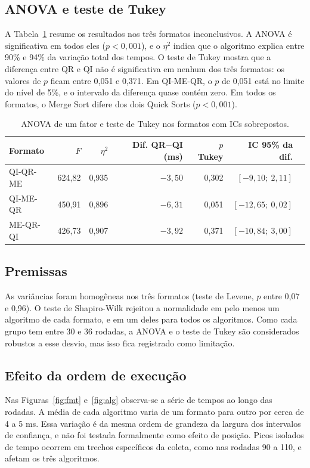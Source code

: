 \documentclass[12pt]{article}
\begin{document}
\subsection{ANOVA e teste de Tukey}

A Tabela~\ref{tab:anova} resume os resultados nos três formatos inconclusivos.
A ANOVA é significativa em todos eles ($p < 0{,}001$), e o $\eta^2$ indica que o
algoritmo explica entre 90\% e 94\% da variação total dos tempos. O teste de
Tukey mostra que a diferença entre QR e QI não é significativa em nenhum dos
três formatos: os valores de $p$ ficam entre 0,051 e 0,371. Em QI-ME-QR, o
$p$ de 0,051 está no limite do nível de 5\%, e o intervalo da diferença quase
contém zero. Em todos os formatos, o Merge Sort difere dos dois Quick Sorts
($p < 0{,}001$).

\begin{table}[ht]
\centering
\caption{ANOVA de um fator e teste de Tukey nos formatos com ICs sobrepostos.}
\label{tab:anova}
\footnotesize
\begin{tabular}{lrrrrrl}
\toprule
Formato & $F$ & $\eta^2$ & Dif. QR$-$QI (ms) & $p$ Tukey & IC 95\% da dif. \\
\midrule
QI-QR-ME & 624,82 & 0,935 & $-3{,}50$ & 0,302 & $[-9{,}10;\ 2{,}11]$ \\
QI-ME-QR & 450,91 & 0,896 & $-6{,}31$ & 0,051 & $[-12{,}65;\ 0{,}02]$ \\
ME-QR-QI & 426,73 & 0,907 & $-3{,}92$ & 0,371 & $[-10{,}84;\ 3{,}00]$ \\
\bottomrule
\end{tabular}
\end{table}

\subsection{Premissas}

As variâncias foram homogêneas nos três formatos (teste de Levene, $p$ entre
0,07 e 0,96). O teste de Shapiro-Wilk rejeitou a normalidade em pelo menos um
algoritmo de cada formato, e em um deles para todos os algoritmos. Como cada
grupo tem entre 30 e 36 rodadas, a ANOVA e o teste de Tukey são considerados
robustos a esse desvio, mas isso fica registrado como limitação.

\subsection{Efeito da ordem de execução}

Nas Figuras~\ref{fig:fmt} e~\ref{fig:alg} observa-se a série de tempos ao
longo das rodadas. A média de cada algoritmo varia de um formato para outro
por cerca de 4 a 5 ms. Essa variação é da mesma ordem de grandeza da largura
dos intervalos de confiança, e não foi testada formalmente como efeito de
posição. Picos isolados de tempo ocorrem em trechos específicos da coleta,
como nas rodadas 90 a 110, e afetam os três algoritmos.
\end{document}

